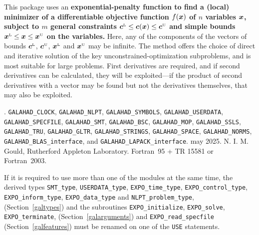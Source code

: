 \documentclass{galahad}
\newcommand{\packagename}{EXPO}
\newcommand{\fullpackagename}{\libraryname\_\packagename}
\newcommand{\sL}{\s{L}}
\newcommand{\sU}{\s{U}}
\begin{document}
\galheader


\galsummary
This package uses an {\bf exponential-penalty function to find a (local)
minimizer of a differentiable objective function $f({\bm{x}})$
of $n$ variables ${\bm{x}}$, subject 
to $m$ general constraints $\bmc\sL \leq \bmc(\bmx) \leq \bmc\sU$
and simple bounds $\bmx\sL \leq \bmx \leq \bmx\sU$ on the variables.}
Here, any of the components of the vectors of bounds 
$\bmc\sL$, $\bmc\sU$, $\bmx\sL$ and $\bmx\sU$ may be infinite. 
The method offers the choice of direct
and iterative solution of the key unconstrained-optimization subproblems, and
is most suitable for large problems. First derivatives are required,
and if second derivatives can be calculated, they will be exploited---if
the product of second derivatives with a vector may be found but
not the derivatives themselves, that may also be exploited.


\galattributes
\galversions{\tt  \fullpackagename\_single, \fullpackagename\_double}.
\galuses
{\tt GALAHAD\_CLOCK},
{\tt GALAHAD\_NLPT},
{\tt GALAHAD\_SY\-M\-BOLS},
{\tt GALAHAD\_USERDATA},
{\tt GALAHAD\_SPECFILE},
{\tt GALAHAD\_SMT},
{\tt GALAHAD\_BSC},
{\tt GALAHAD\_MOP},
{\tt GALAHAD\_\-SSLS},
{\tt GALAHAD\_TRU},
{\tt GALAHAD\_GLTR},
{\tt GALAHAD\_STRINGS},
{\tt GALAHAD\_SPACE},
{\tt GALAHAD\_\-NORMS},
{\tt GALAHAD\_BLAS\_interface},
and
{\tt GALAHAD\_LAPACK\_interface}.
\galdate may 2025.
\galorigin N. I. M. Gould, Rutherford Appleton Laboratory.
\gallanguage Fortran~95 + TR 15581 or Fortran~2003.


\galhowto



\noindent
If it is required to use more than one of the modules at the same time, 
the derived types
{\tt SMT\_type},
{\tt USERDATA\_\-type},
{\tt \packagename\_time\_\-type},
{\tt \packagename\_control\_type},
{\tt \packagename\_inform\_type},
{\tt \packagename\_data\_type}
and
{\tt NLPT\_problem\_type},
(Section~\ref{galtypes})
and the subroutines
{\tt \packagename\_\-initialize},
{\tt \packagename\_\-solve},
{\tt \packagename\_terminate},
(Section~\ref{galarguments})
and
{\tt \packagename\_read\_specfile}
(Section~\ref{galfeatures})
must be renamed on one of the {\tt USE} statements.
\end{document}
